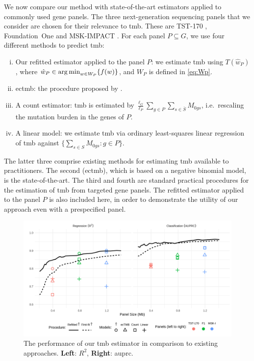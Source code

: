 \documentclass[../thesis.tex]{subfiles}
\begin{document}
We now compare our method with state-of-the-art estimators applied to commonly used gene panels. The three next-generation sequencing panels that we consider are chosen for their relevance to \gls{tmb}. These are TST-170 \citep{heydt_evaluation_2018}, Foundation~One \citep{frampton_development_2013} and MSK-IMPACT \citep{cheng_memorial_2015}.
For each panel $P \subseteq G$, we use four different methods to predict \gls{tmb}:
\begin{enumerate}[(i)]
 \item Our refitted estimator applied to the panel $P$: we estimate \gls{tmb} using $T(\hat{w}_P)$, where $\hat{w}_P \in \operatorname*{arg\,min}_{w \in W_P} \{f(w)\}$, and $W_P$ is defined in \eqref{eq:Wp}. 
 \item \gls{ectmb}: the procedure proposed by \citet{yao_ectmb_2020}.
 \item A count estimator: \gls{tmb} is estimated by $\frac{\ell_G}{\ell_P} \sum_{g \in P} \sum_{s \in \bar{S}}M_{0gs}$, i.e.~rescaling the mutation burden in the genes of $P$. 
 \item A linear model: we estimate \gls{tmb} via ordinary least-squares linear regression of \gls{tmb} against $\bigl\{\sum_{s\in S} M_{0gs}: g \in P \bigr\}$.
\end{enumerate}
The latter three comprise existing methods for estimating \gls{tmb} available to practitioners. The second (\gls{ectmb}), which is based on a negative binomial model, is the state-of-the-art. The third and fourth are standard practical procedures for the estimation of \gls{tmb} from targeted gene panels. The refitted estimator applied to the panel $P$ is also included here, in order to demonstrate the utility of our approach even with a prespecified panel.

\begin{figure}[htbp]
\centering
\includegraphics[width=6in]{figures/chapter3/fig7.png}
\vspace*{-5mm}
\caption{The performance of our \gls{tmb} estimator in comparison to existing approaches. \textbf{Left}: $R^2$, \textbf{Right}: \gls{auprc}. \label{fig:commercial_comparison}}
\vspace*{-2mm}
\end{figure}
\end{document}
